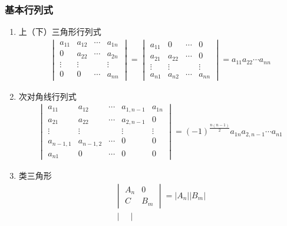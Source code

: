 \documentclass[12pt]{book}
\begin{document}
\subsubsection{基本行列式}

\begin{enumerate}[1.]
    \item 上（下）三角形行列式
    \begin{gather*}
        \begin{vmatrix}
            a_{11} & a_{12} & \cdots & a_{1n} \\
            0 & a_{22} & \cdots & a_{2n} \\
            \vdots & \vdots &        & \vdots \\
            0 & 0 & \cdots & a_{nn} 
        \end{vmatrix} 
        = \begin{vmatrix}
            a_{11} & 0 & \cdots & 0 \\
            a_{21} & a_{22} & \cdots & 0 \\
            \vdots & \vdots &        & \vdots \\
            a_{n1} & a_{n2} & \cdots & a_{nn} 
        \end{vmatrix}
        = a_{11} a_{22} \cdots a_{nn}
    \end{gather*}
    \item 次对角线行列式
    \begin{gather*}
        \begin{vmatrix}
            a_{11} & a_{12} & \cdots & a_{1,n-1} & a_{1n} \\
            a_{21} & a_{22} & \cdots & a_{2,n-1} & 0 \\
            \vdots & \vdots &        & \vdots    & \vdots \\
            a_{n-1,1} & a_{n-1,2} & \cdots & 0 & 0  \\
            a_{n1} & 0 & \cdots & 0 & 0
        \end{vmatrix}
        = (-1)^{\frac{n(n-1)}{2}} a_{1n} a_{2,n-1} \cdots a_{n1}
    \end{gather*}
    \item 类三角形
    \begin{gather*}
        \begin{vmatrix}
            A_n & 0 \\
            C   & B_m 
        \end{vmatrix}
        = |A_n| |B_m| \\
        \begin{vmatrix}

\end{vmatrix}
\end{gather*}
\end{enumerate}
\end{document}
